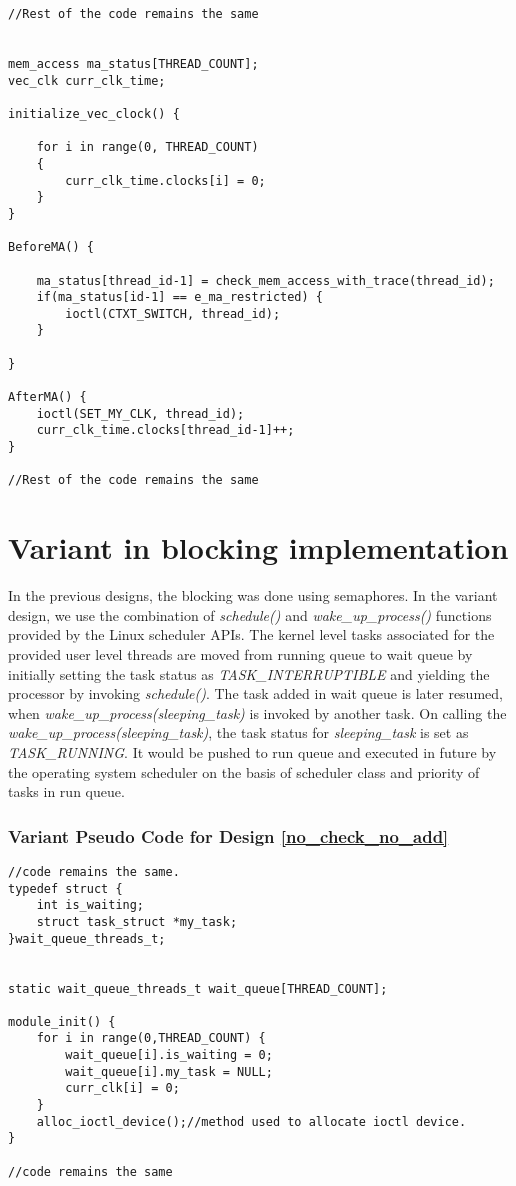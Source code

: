 \begin{lstlisting}[title=User Space Implementation, style=customc]
//Rest of the code remains the same


mem_access ma_status[THREAD_COUNT];
vec_clk curr_clk_time;

initialize_vec_clock() {

    for i in range(0, THREAD_COUNT)
    {
        curr_clk_time.clocks[i] = 0;
    }
}

BeforeMA() {

	ma_status[thread_id-1] = check_mem_access_with_trace(thread_id);
	if(ma_status[id-1] == e_ma_restricted) {
		ioctl(CTXT_SWITCH, thread_id);	
	}
	  
}

AfterMA() {	
	ioctl(SET_MY_CLK, thread_id);
	curr_clk_time.clocks[thread_id-1]++;
}

//Rest of the code remains the same

\end{lstlisting}

\section{Variant in blocking implementation}

In the previous designs, the blocking was done using semaphores. 
In the variant design, we use the combination of \emph{schedule()} and \emph{wake\_up\_process()} functions provided by the Linux scheduler APIs. 
The kernel level tasks associated for the provided user level threads are moved from running queue to wait queue by initially setting the task status as \emph{TASK\_INTERRUPTIBLE} and yielding the processor by invoking \emph{schedule()}. 
The task added in wait queue is later resumed, when \emph{wake\_up\_process(sleeping\_task)} is invoked by another task. 
On calling the \emph{wake\_up\_process(sleeping\_task)}, the task status for \emph{sleeping\_task} is set as \emph{TASK\_RUNNING}. 
It would be pushed to run queue and executed in future by the operating system scheduler on the basis of scheduler class and priority of tasks in run queue. 
 
 
\subsubsection*{Variant Pseudo Code for Design \ref{no_check_no_add}}

\begin{lstlisting}[title=Kernel Space - General module definitions, style=customc]
//code remains the same.
typedef struct {
	int is_waiting;
	struct task_struct *my_task;
}wait_queue_threads_t;


static wait_queue_threads_t wait_queue[THREAD_COUNT];

module_init() {
	for i in range(0,THREAD_COUNT) {
		wait_queue[i].is_waiting = 0; 
		wait_queue[i].my_task = NULL;
		curr_clk[i] = 0;
	}
	alloc_ioctl_device();//method used to allocate ioctl device.
}

//code remains the same
\end{lstlisting}

